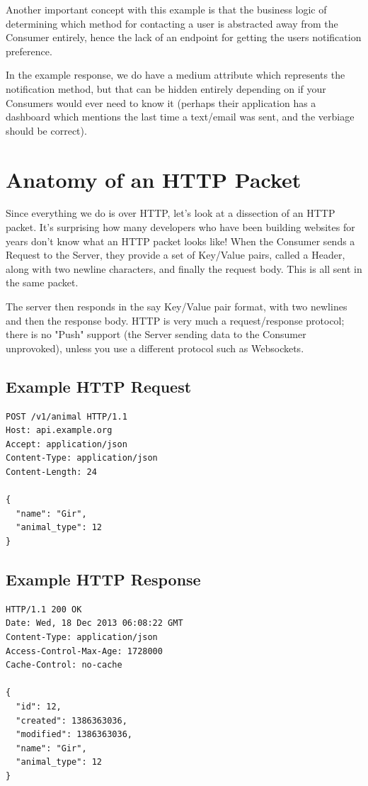 \documentclass{book}
\begin{document}
Another important concept with this example is that the business logic of determining which method for contacting a user is abstracted away from the Consumer entirely, hence the lack of an endpoint for getting the users notification preference.

In the example response, we do have a medium attribute which represents the notification method, but that can be hidden entirely depending on if your Consumers would ever need to know it (perhaps their application has a dashboard which mentions the last time a text/email was sent, and the verbiage should be correct).

\section{Anatomy of an HTTP Packet}

Since everything we do is over HTTP, let's look at a dissection of an HTTP packet. It's surprising how many developers who have been building websites for years don't know what an HTTP packet looks like! When the Consumer sends a Request to the Server, they provide a set of Key/Value pairs, called a Header, along with two newline characters, and finally the request body. This is all sent in the same packet.

The server then responds in the say Key/Value pair format, with two newlines and then the response body. HTTP is very much a request/response protocol; there is no "Push" support (the Server sending data to the Consumer unprovoked), unless you use a different protocol such as Websockets.

\subsection{Example HTTP Request}

\begin{verbatim}
POST /v1/animal HTTP/1.1
Host: api.example.org
Accept: application/json
Content-Type: application/json
Content-Length: 24

{
  "name": "Gir",
  "animal_type": 12
}
\end{verbatim}

\subsection{Example HTTP Response}

\begin{verbatim}
HTTP/1.1 200 OK
Date: Wed, 18 Dec 2013 06:08:22 GMT
Content-Type: application/json
Access-Control-Max-Age: 1728000
Cache-Control: no-cache

{
  "id": 12,
  "created": 1386363036,
  "modified": 1386363036,
  "name": "Gir",
  "animal_type": 12
}
\end{verbatim}
\end{document}
